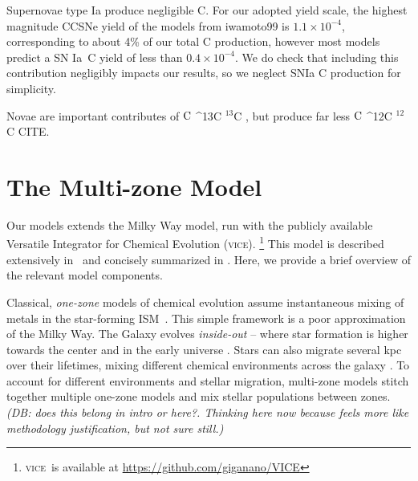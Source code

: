 \documentclass[fleqn,
usenatbib]{mnras}
\makeatletter
\newcommand{\JJ}{\citetalias{james+21}}
\newcommand{\VICE}{\textsc{vice}}
\newcommand{\ia}{SN Ia}
\newcommand{\C}[1][\@nil]{
    \def\tmp{#1}%
    \ifx\tmp\@nnil%
        \ensuremath{\rm C}%
    \else%
        \ifmmode ^{#1}{\rm C}%
        \else $^{#1}$C%
        \fi%
\fi }
\newcommand{\dbadd}[1]{{\color{Thistle} #1}}
\newcommand{\dbnote}[1]{ {\color{Thistle} \textit{\small (DB: #1)}} }
\makeatother
\begin{document}
Supernovae type Ia produce negligible C. For our adopted yield scale, the highest magnitude CCSNe yield of the models from iwamoto99 is $1.1\times10^{-4}$, corresponding to about 4\% of our total C production, however most models predict a \ia\ C yield of less than $0.4 \times 10^{-4}$. We do check that including this contribution negligibly impacts our results, so we neglect SNIa C production for simplicity.

Novae are important contributes of \C[13], but produce far less \C[12] \dbadd{CITE}.



\section{The Multi-zone Model}\label{sec:vice}

Our models extends the \citet[hereafter \JJ]{james+21} Milky Way model, run with the publicly available Versatile Integrator for Chemical Evolution (\VICE).%
    \footnote{\VICE~is available at \url{https://github.com/giganano/VICE}}
This model is described extensively in \JJ~and concisely summarized  in \citet{james+23}. Here, we provide a brief overview of the relevant model components.

Classical, \textit{one-zone} models of chemical evolution assume instantaneous mixing of metals in the star-forming ISM\ \citep[e.g.][]{matteucci21}. This simple framework is a poor approximation of the Milky Way.  The Galaxy evolves \textit{inside-out} -- where star formation is higher towards the center and in the early universe \citep{WF91, kauffmann96, bird+13}. Stars can also migrate several kpc over their lifetimes, mixing different chemical environments across the galaxy \citep{bird+12,sellwood+binney02}. To account for different environments and stellar migration, multi-zone models stitch together multiple one-zone models and mix stellar populations between zones. \dbnote{does this belong in intro or here?. Thinking here now because feels more like methodology justification, but not sure still.}
\end{document}
